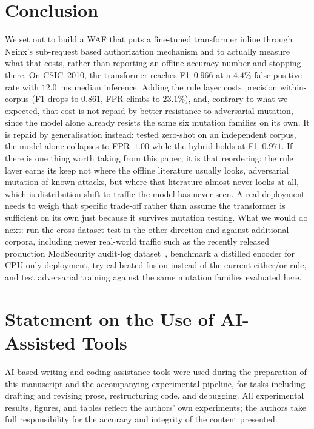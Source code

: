 \documentclass[conference]{IEEEtran}
\begin{document}
\section{Conclusion}
We set out to build a WAF that puts a fine-tuned transformer inline
through Nginx's sub-request based authorization mechanism and to
actually measure what that costs, rather than reporting an offline
accuracy number and stopping there.
On CSIC~2010, the transformer reaches F1~$0.966$ at a $4.4\%$ false-positive
rate with $12.0$~ms median inference. Adding the rule layer costs
precision within-corpus (F1 drops to $0.861$, FPR climbs to $23.1\%$),
and, contrary to what we expected, that cost is not repaid by better
resistance to
adversarial mutation, since the model alone already resists the same six
mutation families on its own. It is repaid by generalisation instead: tested
zero-shot on an independent corpus, the model alone collapses to FPR~$1.00$
while the hybrid holds at F1~$0.971$. If there is one thing worth taking
from this paper, it is that reordering: the rule layer earns its keep not
where the offline literature usually looks, adversarial mutation of
known attacks, but where that literature almost never looks at all,
which is distribution shift to traffic the model has never seen. A real deployment
needs to weigh that specific trade-off rather than assume the transformer is
sufficient on its own just because it survives mutation testing. What we
would do next: run the cross-dataset test in the other direction and
against additional corpora, including newer real-world traffic such as
the recently released production ModSecurity audit-log
dataset~\cite{modsec30day2025}, benchmark a distilled encoder for CPU-only
deployment, try calibrated fusion instead of the current either/or rule,
and test adversarial training against the same mutation families evaluated
here.

\section*{Statement on the Use of AI-Assisted Tools}
AI-based writing and coding assistance tools were used during the
preparation of this manuscript and the accompanying experimental
pipeline, for tasks including drafting and revising prose, restructuring
code, and debugging. All experimental results, figures, and tables
reflect the authors' own experiments; the authors take full
responsibility for the accuracy and integrity of the content presented.



\end{document}
